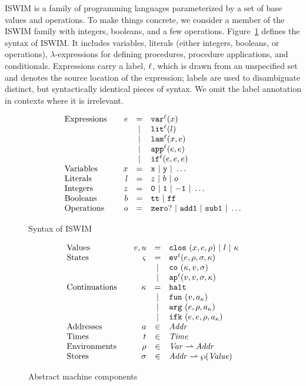 \documentclass[preprint,onecolumn,9pt]{sigplanconf} %
\begin{document}
ISWIM is a family of programming languages parameterized by a set of base values and operations.
%
To make things concrete, we consider a member of the ISWIM family with integers, booleans, and a few operations.
%
Figure~\ref{fig:syntax} defines the syntax of ISWIM.
%
It includes variables, literals (either integers, booleans, or operations), $\lambda$-expressions for defining procedures, procedure applications, and conditionals.
%
Expressions carry a label, ${\ell}$, which is drawn from an unspecified set and denotes the source location of the expression; labels are used to disambiguate distinct, but syntactically identical pieces of syntax.
%
We omit the label annotation in contexts where it is irrelevant.

\begin{figure}
\small
\[
\begin{array}{l@{\qquad}rcl}
\text{Expressions} & \mexp &=& \svar[^\mlab]\mvar\\
&&|& \slit[^\mlab]\mlit\\
&&|& \slam[^\mlab]\mvar\mexp\\
&&|& \sapp[^\mlab]\mexp\mexp \\
&&|& \sif[^\mlab]\mexp\mexp\mexp \\
\text{Variables}&\mvar &=& \syntax{x}\ |\ \syntax{y}\ |\ \dots\\
\text{Literals}&\mlit &=& \mnum\ |\ \mbln\ |\ \mop\\
\text{Integers}&\mnum &=& \syntax{0}\ |\ \syntax{1}\ |\ \syntax{-1}\ |\ \dots\\
\text{Booleans}&\mbln &=& \strue\ |\ \sfalse\\
\text{Operations}&\mop &=& \syntax{zero?}\ |\ \syntax{add1}\ |\ \syntax{sub1}\ |\ \dots
\end{array}
\]
\caption{Syntax of ISWIM}
\label{fig:syntax}
\end{figure}

\begin{figure}
\small
\[
\begin{array}{l@{\qquad}rcl}
\text{Values} & \mval,\mvalx{u} &=& \clos{\mvar,\mexp,\menv}\ |\ \mlit\ |\ \mkont\\
\text{States} & \mstate &=& \ev[^\mcntr]{\mexp,\menv,\msto,\mkont}\\
                       &&|& \co{\mkont,\mval,\msto}\\
                       &&|& \ap[^\mcntr]{\mval,\mval,\msto,\mkont}\\
\text{Continuations} & \mkont &=& \kmt\\
&&|& \kfn{\mval,\mkaddr}\\
&&|& \kar{\mexp,\menv,\mkaddr}\\
&&|& \kif{\mexp,\mexp,\menv,\mkaddr}\\
\text{Addresses} &\maddr&\in&\Addr \\
\text{Times} &\mcntr&\in&\Counter \\
\text{Environments} &\menv&\in& \Var \rightharpoonup \Addr\\
\text{Stores} &\msto&\in& \Addr \rightharpoonup \wp(\Value)
\end{array}
\]
\caption{Abstract machine components}
\label{fig:domains}
\end{figure}
\end{document}
